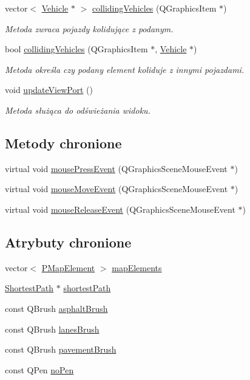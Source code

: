 \begin{DoxyCompactItemize}
vector$<$ \hyperlink{class_vehicle}{Vehicle} $\ast$ $>$ \hyperlink{class_scene_a560c19dc6d85da16487c4d60db3578e8}{colliding\-Vehicles} (Q\-Graphics\-Item $\ast$)
\begin{DoxyCompactList}\small\item\em Metoda zwraca pojazdy kolidujące z podanym. \end{DoxyCompactList}\item 
bool \hyperlink{class_scene_abd71e84fa122bce0104dbcf701b9edd8}{colliding\-Vehicles} (Q\-Graphics\-Item $\ast$, \hyperlink{class_vehicle}{Vehicle} $\ast$)
\begin{DoxyCompactList}\small\item\em Metoda określa czy podany element koliduje z innymi pojazdami. \end{DoxyCompactList}\item 
void \hyperlink{class_scene_a82b551d4fd83aaeb36ba341365963105}{update\-View\-Port} ()
\begin{DoxyCompactList}\small\item\em Metoda służąca do odświeżania widoku. \end{DoxyCompactList}\end{DoxyCompactItemize}
\subsection*{Metody chronione}
\begin{DoxyCompactItemize}
\item 
virtual void \hyperlink{class_scene_a6ad4dcff66d55c4f1a7cd2c5364459ef}{mouse\-Press\-Event} (Q\-Graphics\-Scene\-Mouse\-Event $\ast$)
\item 
virtual void \hyperlink{class_scene_ae046b7a5d0dc99d01c059961fff16d95}{mouse\-Move\-Event} (Q\-Graphics\-Scene\-Mouse\-Event $\ast$)
\item 
virtual void \hyperlink{class_scene_adffea18c1ebe0abd3291ac48b0f83211}{mouse\-Release\-Event} (Q\-Graphics\-Scene\-Mouse\-Event $\ast$)
\end{DoxyCompactItemize}
\subsection*{Atrybuty chronione}
\begin{DoxyCompactItemize}
\item 
vector$<$ \hyperlink{_types_8h_a4260a5280323637f8a1fa28e89b6ef14}{P\-Map\-Element} $>$ \hyperlink{class_scene_a209cfc1d4f90fb58093a3db2fad23e08}{map\-Elements}
\item 
\hyperlink{class_shortest_path}{Shortest\-Path} $\ast$ \hyperlink{class_scene_a279299a043594536431e538c2bdd76e7}{shortest\-Path}
\item 
const Q\-Brush \hyperlink{class_scene_a61809011ee96172d42280dd9aa1c0846}{asphalt\-Brush}
\item 
const Q\-Brush \hyperlink{class_scene_a3cc532bd0e9e328041509d829d58f50d}{lanes\-Brush}
\item 
const Q\-Brush \hyperlink{class_scene_aa07495f36b834636c73de85b6f8143f9}{pavement\-Brush}
\item 
const Q\-Pen \hyperlink{class_scene_a310ffbaf94652c71e44c3576caa2bd99}{no\-Pen}
\end{DoxyCompactItemize}
